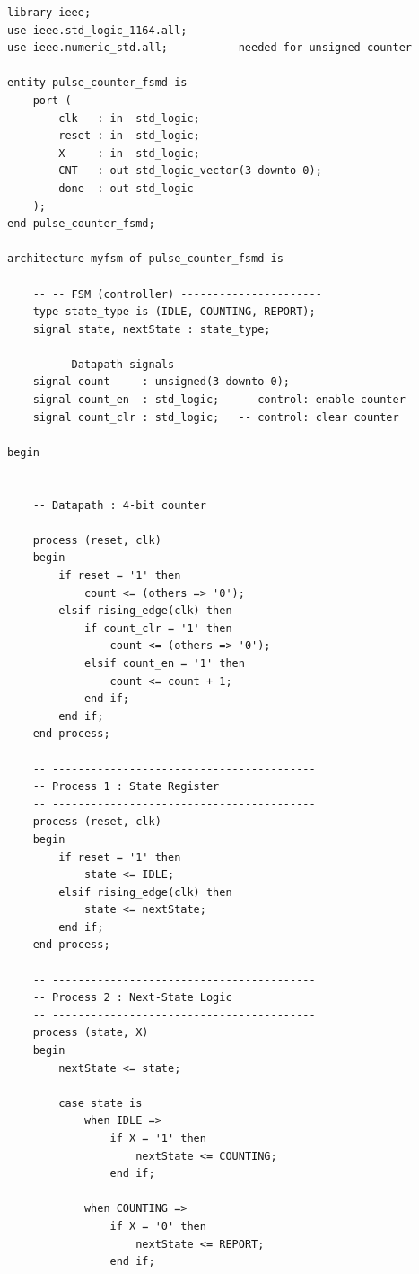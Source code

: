 \documentclass[12pt,a4paper]{article}
\begin{document}
\begin{tcolorbox}[vhdlbox, title={Level 6 --- pulse\_counter\_fsmd.vhd}]
\begin{lstlisting}[style=vhdlstyle]
library ieee;
use ieee.std_logic_1164.all;
use ieee.numeric_std.all;        -- needed for unsigned counter

entity pulse_counter_fsmd is
    port (
        clk   : in  std_logic;
        reset : in  std_logic;
        X     : in  std_logic;
        CNT   : out std_logic_vector(3 downto 0);
        done  : out std_logic
    );
end pulse_counter_fsmd;

architecture myfsm of pulse_counter_fsmd is

    -- -- FSM (controller) ----------------------
    type state_type is (IDLE, COUNTING, REPORT);
    signal state, nextState : state_type;

    -- -- Datapath signals ----------------------
    signal count     : unsigned(3 downto 0);
    signal count_en  : std_logic;   -- control: enable counter
    signal count_clr : std_logic;   -- control: clear counter

begin

    -- -----------------------------------------
    -- Datapath : 4-bit counter
    -- -----------------------------------------
    process (reset, clk)
    begin
        if reset = '1' then
            count <= (others => '0');
        elsif rising_edge(clk) then
            if count_clr = '1' then
                count <= (others => '0');
            elsif count_en = '1' then
                count <= count + 1;
            end if;
        end if;
    end process;

    -- -----------------------------------------
    -- Process 1 : State Register
    -- -----------------------------------------
    process (reset, clk)
    begin
        if reset = '1' then
            state <= IDLE;
        elsif rising_edge(clk) then
            state <= nextState;
        end if;
    end process;

    -- -----------------------------------------
    -- Process 2 : Next-State Logic
    -- -----------------------------------------
    process (state, X)
    begin
        nextState <= state;

        case state is
            when IDLE =>
                if X = '1' then
                    nextState <= COUNTING;
                end if;

            when COUNTING =>
                if X = '0' then
                    nextState <= REPORT;
                end if;


\end{lstlisting}
\end{tcolorbox}
\end{document}
